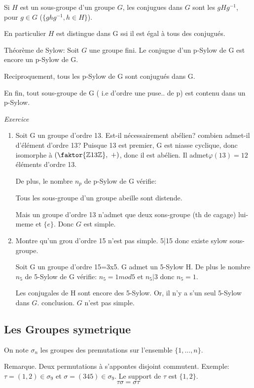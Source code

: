 \begin{definition}
	Si $H$ est un sous-groupe d'un groupe $G$, les conjugues dans $G$ sont les $gHg^{-1}$, pour $g\in G$ ($\{ghg^{-1}, h\in H\}$).
\end{definition}

En particulier $H$ est distingue dans G ssi il est égal à tous des conjugués.

Théorème de Sylow: Soit $G$ une groupe fini.
Le conjugue d'un p-Sylow de G est encore un p-Sylow de G.

Reciproquement, tous les p-Sylow de G sont conjugués dans G.

En fin, tout sous-groupe de G ( i.e d'ordre une puse.. de p) est contenu dans un p-Sylow.

\emph{Exercice}
\begin{enumerate}
	\item Soit G un groupe d'ordre 13. Est-il nécessairement abélien? combien admet-il d'élément d'ordre 13?
	Puisque 13 est premier, G est niasse cyclique, donc isomorphe à $(\faktor{\mathbb{Z}{13\mathbb{Z}}},\ +)$, donc il est abélien. Il admet$\varphi(13)=12$ éléments d'ordre 13.
	
	De plus, le nombre $n_p$ de p-Sylow de G vérifie:
	
	Tous les sous-groupe d'un groupe abeille sont distende.
	
	Mais un groupe d'ordre 13 n'admet que deux sons-groupe (th de cagage) lui-meme et $\{e\}$. Donc $G$ est simple.
	\item Montre qu'un grou d'ordre 15 n'est pas simple. 5|15 donc existe sylow sous-groupe. 
	
	Soit G un groupe d'ordre 15=3x5. G admet un 5-Sylow H. De plus le nombre $n_5$ de 5-Sylow de G vérifie: $n_5=1 mod 5$ et $n_5 | 3$ donc $n_5=1$.
	
	Les conjugales de H sont encore des 5-Sylow. Or, il n'y a s'un seul 5-Sylow dans $G$. conclusion. $G$ n'est pas simple.
\end{enumerate}


\subsection{Les Groupes symetrique} %
\label{sec:les_groupes_symetrique}

On note $\sigma_n$ les groupes des premutations sur l'ensemble $\{1, ..., n\}$.

Remarque. Deux permutations à s'appontes disjoint commutent.
Exemple: $\tau=(1, 2)\in \sigma_9$ et $\sigma=(345) \in \sigma_9$.
Le support de $\tau$ est $\{1,2\}$. 
$$\tau\sigma =\sigma \tau$$

